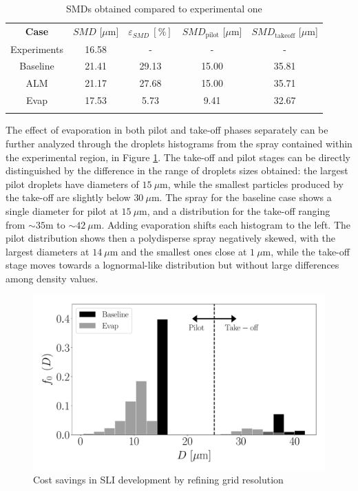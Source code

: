 \begin{table}[!h]
\centering
\caption{SMDs obtained compared to experimental one}
\begin{tabular}{ccccc}
\thickhline
\textbf{Case} & $SMD$ [$\mu$m] & $\varepsilon_{SMD}~\left[\% \right]$ & $SMD_\mathrm{pilot}$ [$\mu$m] & $SMD_\mathrm{takeoff}$ [$\mu$m]   \\
\thickhline
Experiments & 16.58 & - & - & - \\
Baseline & 21.41 & 29.13 &15.00 & 35.81 \\
ALM & 21.17 & 27.68 & 15.00 & 35.71 \\
Evap & 17.53 & 5.73 & 9.41 & 32.67 \\ 
\thickhline
\end{tabular}
\label{tab:BIMER_dispersed_phase_SMDs}
\end{table}


The effect of evaporation in both pilot and take-off phases separately can be further analyzed through the droplets histograms from the spray contained within the experimental region, in Figure \ref{fig:LGS_BIMER_droplets_histograms}. The take-off and pilot stages can be directly distinguished by the difference in the range of droplets sizes obtained: the largest pilot droplets have diameters of $15~\mu$m, while the smallest particles produced by the take-off are slightly below $30~\mu$m. The spray for the baseline case shows a single diameter for pilot at $15~\mu$m, and a distribution for the take-off ranging from $\sim 35$m to $\sim 42~\mu$m. Adding evaporation shifts each histogram to the left. The pilot distribution shows then a polydisperse spray negatively skewed, with the largest diameters at $14~\mu$m and the smallest ones close at $1~\mu$m, while the take-off stage moves towards a lognormal-like distribution but without large differences among density values.




\begin{figure}[ht]
   \centering
   \includegraphics[scale=0.4]{./part3_applications/figures_ch9_lagrangian/droplets_histograms}
   \caption{Cost savings in SLI development by refining grid resolution}
   \label{fig:LGS_BIMER_droplets_histograms}
\end{figure}

